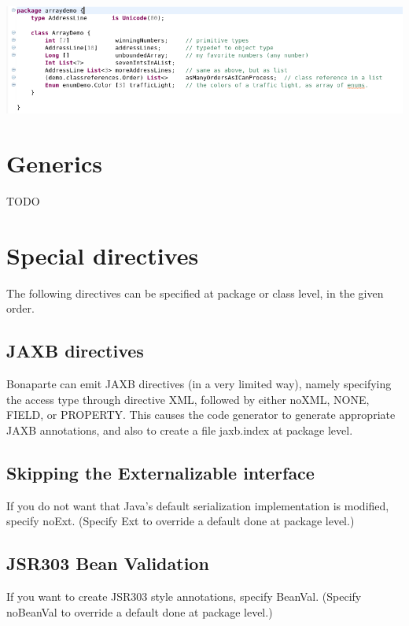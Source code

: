 \documentclass[11pt,a4paper,oneside]{article}
\begin{document}
\vspace{2mm}

\hspace{1cm}\includegraphics[scale=0.5]{images/tut1-015-arrays.png}

\section{Generics}
TODO

\section{Special directives}
The following directives can be specified at package or class level, in the given order. 
\subsection{JAXB directives}
Bonaparte can emit JAXB directives (in a very limited way), namely specifying the access type through directive {\ttfamily XML}, followed
by either {\ttfamily noXML}, {\ttfamily NONE}, {\ttfamily FIELD}, or {\ttfamily PROPERTY}. This causes the code generator to generate
appropriate JAXB annotations, and also to create a file {\ttfamily jaxb.index} at package level.
 

\subsection{Skipping the {\ttfamily Externalizable} interface}
If you do not want that Java's default serialization implementation is modified, specify {\ttfamily noExt}. (Specify {\ttfamily Ext} to
override a default done at package level.)

\subsection{JSR303 Bean Validation}
If you want to create JSR303 style annotations, specify {\ttfamily BeanVal}. (Specify {\ttfamily noBeanVal} to
override a default done at package level.)

\vspace{2mm}
\end{document}

